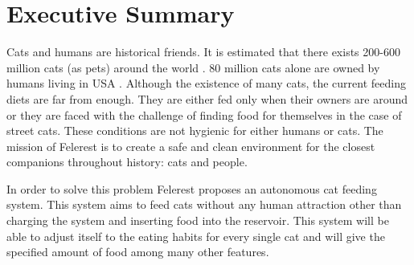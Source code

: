 \section{Executive Summary}
\label{sec:executiveSummary}

Cats and humans are historical friends. It is estimated that there exists 200-600 million cats (as pets) around the world \cite{cite:wikihuman}.
80 million cats alone are owned by humans living in USA \cite{cite:natgeocat}.
Although the existence of many cats, the current feeding diets are far from enough. They are either fed only when their owners are around or they are faced with the challenge of finding food for themselves in the case of street cats. These conditions are not hygienic for either humans or cats. The mission of Felerest is to create a safe and clean environment for the closest companions throughout history: cats and people. 

In order to solve this problem Felerest proposes an autonomous cat feeding system. This system aims to feed cats without any human attraction other than charging the system and inserting food into the reservoir. This system will be able to adjust itself to the eating habits for every single cat and will give the specified amount of food among many other features. 
